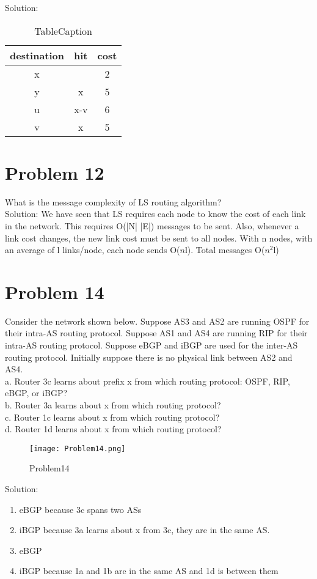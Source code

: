 \documentclass{article}
\begin{document}
\noindent Solution:\\
\begin{table}[htbp]
  \centering
  \begin{tabular}{@{} ccc @{}}
    \hline
    destination & hit & cost \\ 
    \hline
    x &   & 2 \\ 
    y & x & 5 \\ 
    u & x-v & 6 \\ 
    v & x & 5 \\ 
    \hline
  \end{tabular}
  \caption{TableCaption}
  \label{tab:label}
\end{table}


\newpage
\section{Problem 12} What is the message complexity of LS routing algorithm? \\

\noindent Solution: We have seen that LS requires each node to know the cost of each link in the network. This requires O(\big|N\big| \big|E\big|) messages to be sent. Also, whenever a link cost changes, the new link cost must be sent to all nodes. With n nodes, with an average of l links/node, each node sends O($n$l). Total messages O($n^2$l)\\





\newpage
\section{Problem 14} Consider the network shown below. Suppose AS3 and AS2 are running OSPF for their intra-AS routing protocol. Suppose AS1 and AS4 are running RIP for their intra-AS routing protocol. Suppose eBGP and iBGP are used for the inter-AS routing protocol. Initially suppose there is no physical link between AS2 and AS4.\\
a. Router 3c learns about prefix x from which routing protocol: OSPF, RIP, eBGP, or iBGP?\\
b. Router 3a learns about x from which routing protocol?\\
c. Router 1c learns about x from which routing protocol?\\
d. Router 1d learns about x from which routing protocol?\\
\begin{figure}[htbp]
\begin{center}
\texttt{[image: Problem14.png]}
\caption{Problem14}
\label{default}
\end{center}
\end{figure}
 

\noindent Solution:\\
\begin{enumerate}
\item eBGP because 3c spans two ASs
\item iBGP because 3a learns about x from 3c, they are in the same AS.
\item eBGP
\item iBGP because 1a and 1b are in the same AS and 1d is between them
\end{enumerate}
\end{document}

